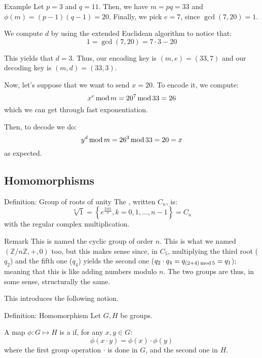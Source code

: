\documentclass[a4paper]{article}
\begin{document}
\begin{parag}{Example}
    Let $p = 3$ and $q = 11$. Then, we have $m = pq = 33$ and $\phi\left(m\right) = \left(p-1\right)\left(q-1\right) = 20$. Finally, we pick $e = 7$, since $\gcd\left(7, 20\right) = 1$.

    We compute $d$ by using the extended Euclidean algorithm to notice that: 
    \[1 = \gcd\left(7, 20\right) = 7\cdot 3 - 20\]
    
    This yields that $d = 3$. Thus, our encoding key is $\left(m, e\right) = \left(33, 7\right)$ and our decoding key is $\left(m, d\right) = \left(33, 3\right)$.

    Now, let's suppose that we want to send $x = 20$. To encode it, we compute: 
    \[x^e \operatorname{mod} m = 20^7 \operatorname{mod} 33 = 26 \]
    which we can get through fast exponentiation.
    
    Then, to decode we do: 
    \[y^d \operatorname{mod} m = 26^3 \operatorname{mod} 33 = 20 = x\]
    as expected.
\end{parag}

\subsection{Homomorphisms}

\begin{parag}{Definition: Group of roots of unity}
    The , written $C_n$, is: 
    \[\sqrt[n]{1} = \left\{e^{\frac{2\pi k i}{n}}, k = 0, 1, \ldots, n-1\right\} = C_n\]
    with the regular complex multiplication.
    
    \begin{subparag}{Remark}
        This is named the cyclic group of order $n$. This is what we named $\left(\mathbb{Z}/n\mathbb{Z}, +, 0\right)$ too, but this makes sense since, in $C_5$, multiplying the third root ($q_2$) and the fifth one ($q_4$) yields the second one ($q_2 \cdot  q_4 = q_{\left(2 + 4\right) \Mod 5} = q_{1}$); meaning that this is like adding numbers modulo $n$. The two groups are thus, in some sense, structurally the same.

        This introduces the following notion.
    \end{subparag}
\end{parag}

\begin{parag}{Definition: Homomorphism}
    Let $G, H$ be groups.

    A map $\phi: G \mapsto H$ is a  if, for any $x, y \in G$: 
    \[\phi\left(x\cdot y\right) = \phi\left(x\right)\cdot \phi\left(y\right)\]
    where the first group operation $\cdot $ is done in $G$, and the second one in $H$.
\end{parag}
\end{document}
